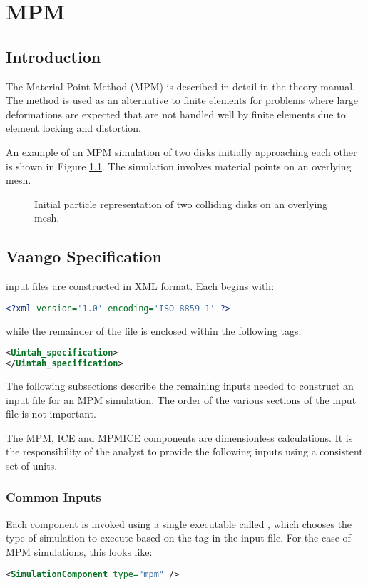 \chapter{MPM} \label{Sec:MPM}

\section{Introduction}
The Material Point Method (MPM)  is described in detail in the \Vaango
theory manual.  The method is used as an alternative to finite elements
for problems where large deformations are expected that are not
handled well by finite elements due to element locking and distortion.

An example of an MPM simulation of two disks initially approaching each other
is shown in Figure \ref{fig-disks_init}.  The simulation involves
material points on an overlying mesh. 
\begin{figure}[h]
  \centering
  \caption{\label{fig-disks_init} Initial particle representation of two
                                colliding disks on an overlying mesh.}
\end{figure}

\section{Vaango Specification} \label{Sec:UintahSpecMPM}
\Vaango input files are constructed in XML format.  Each begins with:
\begin{lstlisting}[language=XML]
<?xml version='1.0' encoding='ISO-8859-1' ?>
\end{lstlisting}
while the remainder of the file is enclosed within the following tags:
\begin{lstlisting}[language=XML]
<Uintah_specification>
</Uintah_specification>
\end{lstlisting}

The following subsections describe the remaining inputs needed to construct
an input file for an MPM simulation.  The order of the various sections 
of the input file is not important.  
\begin{WarningBox}
The MPM, ICE and MPMICE components
are dimensionless calculations.  It is the responsibility of the analyst
to provide the following inputs using a consistent set of units.
\end{WarningBox}

\subsection{Common Inputs} \label{Sec:commonInputs}
Each \Vaango component is invoked using a single executable called
, which chooses the type of simulation
to execute based on the  tag in the
input file.  For the case of MPM simulations, this looks like:
\begin{lstlisting}[language=XML]
 <SimulationComponent type="mpm" />
\end{lstlisting}

